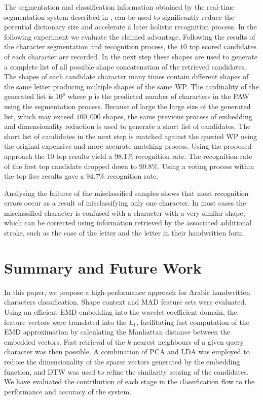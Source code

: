 \documentclass[10pt, conference, compsocconf]{IEEEtran}
\begin{document}
The segmentation and classification information obtained by the real-time segmentation system described in \cite{kour2014real}, can be used to significantly reduce the potential dictionary size and accelerate a later holistic recognition process.
In the following experiment we evaluate the claimed advantage.
Following the results of the character segmentation and recognition process, the $10$ top scored candidates of each character are recorded. 
In the next step these shapes are used to generate a complete list of all possible shape concatenation of the retrieved candidates. 
The shapes of each candidate character many times contain different shapes of the same letter producing multiple shapes of the same WP. 
The cardinality of the generated list is $10^p$ where p is the predicted number of characters in the PAW using the segmentation process. 
Because of large the large size of the generated list, which may exceed $100,000$ shapes, the same previous process of embedding and dimensionality reduction is used to generate a short list of candidates. 
The short list of candidates in the next step is matched against the queried WP using the original expensive and more accurate matching process. 
Using the proposed approach the $10$ top results yield a $98.1\%$ recognition rate. 
The recognition rate of the first top candidate dropped down to $90.8\%$. 
Using a voting process within the top five results gave a $94.7\%$ recognition rate. 

Analysing the failures of the misclassified samples shows that most recognition errors occur as a result of misclassifying only one character. 
In most cases the misclassified character is confused with a character with a very similar shape, which can be corrected using information retrieved by the associated additional stroke, such as the case of the letter  and the letter  in their handwritten form.

\section{Summary and Future Work}
\label{sec:summary_future_work}
In this paper, we propose a high-performance approach for Arabic handwritten characters classification.
Shape context and MAD feature sets were evaluated. 
Using an efficient EMD embedding into the wavelet coefficient domain, the feature vectors were translated into the $L_1$, facilitating fast computation of the EMD approximation by calculating the Manhattan distance between the embedded vectors.
Fast retrieval of the $k$ nearest neighbours of a given query character was then possible.
A combination of PCA and LDA was employed to reduce the dimensionality of the sparse vectors generated by the embedding function, and DTW was used to refine the similarity scoring of the candidates.
We have evaluated the contribution of each stage in the classification flow to the performance and accuracy of the system.
\end{document}
